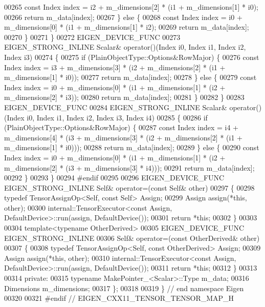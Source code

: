 \begin{DoxyCode}
00265          \textcolor{keyword}{const} Index index = i2 + m\_dimensions[2] * (i1 + m\_dimensions[1] * i0);
00266         \textcolor{keywordflow}{return} m\_data[index];
00267       \} \textcolor{keywordflow}{else} \{
00268          \textcolor{keyword}{const} Index index = i0 + m\_dimensions[0] * (i1 + m\_dimensions[1] * i2);
00269         \textcolor{keywordflow}{return} m\_data[index];
00270       \}
00271     \}
00272     EIGEN\_DEVICE\_FUNC
00273     EIGEN\_STRONG\_INLINE Scalar& operator()(Index i0, Index i1, Index i2, Index i3)
00274     \{
00275       \textcolor{keywordflow}{if} (PlainObjectType::Options&RowMajor) \{
00276         \textcolor{keyword}{const} Index index = i3 + m\_dimensions[3] * (i2 + m\_dimensions[2] * (i1 + m\_dimensions[1] * i0));
00277         \textcolor{keywordflow}{return} m\_data[index];
00278       \} \textcolor{keywordflow}{else} \{
00279         \textcolor{keyword}{const} Index index = i0 + m\_dimensions[0] * (i1 + m\_dimensions[1] * (i2 + m\_dimensions[2] * i3));
00280         \textcolor{keywordflow}{return} m\_data[index];
00281       \}
00282     \}
00283     EIGEN\_DEVICE\_FUNC
00284     EIGEN\_STRONG\_INLINE Scalar& operator()(Index i0, Index i1, Index i2, Index i3, Index i4)
00285     \{
00286       \textcolor{keywordflow}{if} (PlainObjectType::Options&RowMajor) \{
00287         \textcolor{keyword}{const} Index index = i4 + m\_dimensions[4] * (i3 + m\_dimensions[3] * (i2 + m\_dimensions[2] * (i1 + 
      m\_dimensions[1] * i0)));
00288         \textcolor{keywordflow}{return} m\_data[index];
00289       \} \textcolor{keywordflow}{else} \{
00290         \textcolor{keyword}{const} Index index = i0 + m\_dimensions[0] * (i1 + m\_dimensions[1] * (i2 + m\_dimensions[2] * (i3 + 
      m\_dimensions[3] * i4)));
00291         \textcolor{keywordflow}{return} m\_data[index];
00292       \}
00293     \}
00294 \textcolor{preprocessor}{#endif}
00295 
00296     EIGEN\_DEVICE\_FUNC EIGEN\_STRONG\_INLINE Self& operator=(\textcolor{keyword}{const} Self& other)
00297     \{
00298       \textcolor{keyword}{typedef} TensorAssignOp<Self, const Self> Assign;
00299       Assign assign(*\textcolor{keyword}{this}, other);
00300       internal::TensorExecutor<const Assign, DefaultDevice>::run(assign, DefaultDevice());
00301       \textcolor{keywordflow}{return} *\textcolor{keyword}{this};
00302     \}
00303 
00304     \textcolor{keyword}{template}<\textcolor{keyword}{typename} OtherDerived>
00305     EIGEN\_DEVICE\_FUNC EIGEN\_STRONG\_INLINE
00306     Self& operator=(\textcolor{keyword}{const} OtherDerived& other)
00307     \{
00308       \textcolor{keyword}{typedef} TensorAssignOp<Self, const OtherDerived> Assign;
00309       Assign assign(*\textcolor{keyword}{this}, other);
00310       internal::TensorExecutor<const Assign, DefaultDevice>::run(assign, DefaultDevice());
00311       \textcolor{keywordflow}{return} *\textcolor{keyword}{this};
00312     \}
00313 
00314   \textcolor{keyword}{private}:
00315     \textcolor{keyword}{typename} MakePointer\_<Scalar>::Type m\_data;
00316     Dimensions m\_dimensions;
00317 \};
00318 
00319 \} \textcolor{comment}{// end namespace Eigen}
00320 
00321 \textcolor{preprocessor}{#endif // EIGEN\_CXX11\_TENSOR\_TENSOR\_MAP\_H}
\end{DoxyCode}
